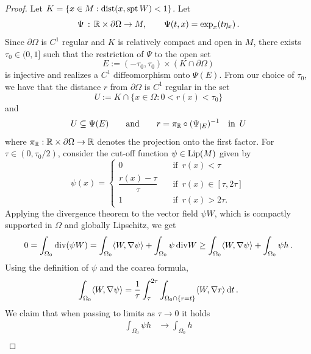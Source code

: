 \documentclass[10 pt,a4paper]{article}
\theoremstyle{definition}
\begin{document}
\begin{proof}
	Let $K = \{x\in M : \mathrm{dist}(x, {\rm spt}\, W) < 1\}$. Let
	\[
		\Psi \, : \, \mathbb R \times \partial\Omega \to M, \qquad \Psi(t,x) = \exp_x(t\eta_x) \, .
	\]
	Since $\partial\Omega$ is $C^1$ regular and $K$ is relatively compact and open in $M$, there exists $\tau_0\in(0,1]$ such that the restriction of $\Psi$ to the open set
	\[
	E := (-\tau_0,\tau_0) \times (K\cap\partial\Omega)
	\]
	is injective and realizes a $C^1$ diffeomorphism onto $\Psi(E)$. From our choice of $\tau_0$, we have that the distance $r$ from $\partial \Omega$ is $C^1$ regular in the set
	\[
		U := K \cap \{x\in\Omega : 0 < r(x) < \tau_0\}
	\]
	and
	\begin{equation} \label{rPsiX}
		U\subseteq\Psi(E) \qquad \text{and} \qquad r = \pi_\mathbb R \circ (\Psi_{|E})^{-1} \quad \text{in } \, U
	\end{equation}
	where $\pi_\mathbb R : \mathbb R \times \partial\Omega \to \mathbb R$ denotes the projection onto the first factor. For $\tau \in (0, \tau_0/2)$, consider the cut-off function $\psi\in\mathrm{Lip}(M)$ given by 
	\begin{equation} \label{def_psiX}
		\psi(x) = \left\{ \begin{array}{ll}
			0 & \quad \text{if } \, r(x) < \tau \\[0.1cm]
			\dfrac{r(x)-\tau}{\tau} & \quad \text{if } \, r(x) \in [\tau, 2\tau] \\[0.3cm]
			1 & \quad \text{if } \, r(x) > 2\tau.
		\end{array}\right.
	\end{equation}
	Applying the divergence theorem to the vector field $\psi W$, which is compactly supported in $\Omega$ and globally Lipschitz, we get
	\begin{equation} \label{div_X}
		0 = \int_{\Omega_0} \mathrm{div} (\psi W) = \int_{\Omega_0} \langle W, \nabla \psi \rangle  + \int_{\Omega_0} \psi \, \mathrm{div} W \geq \int_{\Omega_0} \langle W, \nabla \psi \rangle  + \int_{\Omega_0} \psi h \, .
	\end{equation}
	Using the definition of $\psi$ and the coarea formula,
	\begin{equation} \label{GGloc1}
		\int_{\Omega_0} \langle W, \nabla\psi\rangle = \frac{1}{\tau} \int_\tau^{2\tau} \int_{\Omega_0\cap\{r=t\}}  \langle W, \nabla r\rangle \, \mathrm{d} t \, .
	\end{equation}
	We claim that when passing to limits as $\tau\to0$ it holds
	\begin{align}
		\label{GGloc2a}
		\int_{\Omega_0} \psi h & \to \int_{\Omega_0} h \\

\end{align}
\end{proof}
\end{document}
